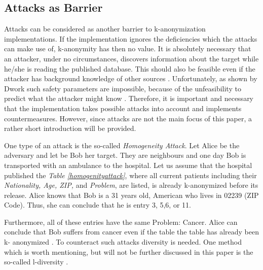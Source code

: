 \documentclass{llncs}
\begin{document}
\subsection{Attacks as Barrier}
Attacks can be considered as another barrier to k-anonymization implementations. If the implementation ignores the deficiencies which the attacks can make use of, k-anonymity has then no value. It is absolutely necessary that an attacker, under no circumstances, discovers information about the target while he/she is reading the published database. This should also be feasible even if the attacker has background knowledge of other sources   \cite{Dalenius1977}. Unfortunately, as shown by Dwork such safety parameters are impossible, because of the unfeasibility to predict what the attacker might know \cite{dwork2011differential}. Therefore, it is important and necessary that the implementation takes possible attacks into account and implements countermeasures. However, since attacks are not the main focus of this paper, a rather short introduction will be provided.

One type of an attack is the so-called \textit{Homogeneity Attack}. Let Alice be the adversary and let be Bob her target. They are neighbours and one day Bob is transported with an ambulance to the hospital. Let us assume that the hospital published the \textit{Table \ref{homogenityattack}}, where all current patients including their \textit{Nationality, Age, ZIP,} and \textit{Problem}, are listed, is already k-anonymized before its release. Alice knows that Bob is a 31 years old, American who lives in 02239 (ZIP Code). Thus, she can conclude that he is entry 3, 5,6, or 11.

Furthermore, all of these entries have the same Problem: Cancer. Alice can conclude that Bob suffers from cancer even if the table the table has already been k- anonymized  \cite{sweeney2002k,ldiversity}. To counteract such attacks diversity is needed. One method which is worth mentioning, but will not be further discussed in this paper is the so-called l-diversity \cite{ldiversity}.  
\end{document}

